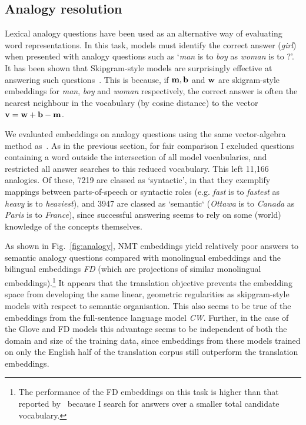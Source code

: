 \subsection{Analogy resolution}

Lexical analogy questions have been used as an alternative way of evaluating word representations. In this task, models must identify the correct answer (\emph{girl}) when presented with analogy questions such as `\emph{man} is to \emph{boy} as \emph{woman} is to ?'. It has been shown that Skipgram-style models are surprisingly effective at answering such questions~\citep{mikolov2013distributed}. This is because, if \( \bf m, b \) and \( \bf w\) are skigram-style embeddings for \emph{man}, \emph{boy} and \emph{woman} respectively, the correct answer is often the nearest neighbour in the vocabulary (by cosine distance) to the vector \( \bf v = w + b - m \). 

We evaluated embeddings on analogy questions using the same vector-algebra method as~\cite{mikolov2013distributed}. As in the previous section, for fair comparison I excluded questions containing a word outside the intersection of all model vocabularies, and restricted all answer searches to this reduced vocabulary. This left 11,166 analogies. Of these, 7219 are classed as `syntactic', in that they exemplify mappings between parts-of-speech or syntactic roles (e.g. \emph{fast} is to \emph{fastest} as \emph{heavy} is to \emph{heaviest}), and 3947 are classed as `semantic` (\emph{Ottawa} is to \emph{Canada} as \emph{Paris} is to \emph{France}), since successful answering seems to rely on some (world) knowledge of the concepts themselves. 

As shown in Fig.~\ref{fig:analogy}, NMT embeddings yield relatively poor answers to semantic analogy questions compared with monolingual embeddings and the bilingual embeddings \emph{FD} (which are projections of similar monolingual embeddings).\footnote{The performance of the FD embeddings on this task is higher than that reported by~\cite{faruqui2014improving} because I search for answers over a smaller total candidate vocabulary.} It appears that the translation objective prevents the embedding space from developing the same linear, geometric regularities as skipgram-style models with respect to semantic organisation. This also seems to be true of the embeddings from the full-sentence language model \emph{CW}. Further, in the case of the Glove and FD models this advantage seems to be independent of both the domain and size of the training data, since embeddings from these models trained on only the English half of the translation corpus still outperform the translation embeddings. 

